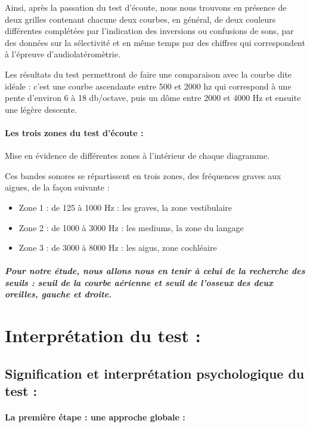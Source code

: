 \documentclass[12pt,french]{report}
\begin{document}
Ainsi, après la passation du test d\textquoteright écoute, nous nous
trouvons en présence de deux grilles contenant chacune deux courbes,
en général, de deux couleurs différentes complétées par l'indication
des inversions ou confusions de sons, par des données sur la sélectivité
et en même temps par des chiffres qui correspondent à l'épreuve d'audiolatéromètrie.

Les résultats du test permettront de faire une comparaison avec la
courbe dite idéale : c'est une courbe ascendante entre 500 et 2000
hz qui correspond à une pente d\textquoteright environ 6 à 18 db/octave,
puis un dôme entre 2000 et 4000 Hz et ensuite une légère descente. 

\paragraph{Les trois zones du test d'écoute : }

Mise en évidence de différentes zones à l\textquoteright intérieur
de chaque diagramme. 

Ces bandes sonores se répartissent en trois zones, des fréquences
graves aux aigues, de la façon suivante :
\begin{itemize}
\item Zone 1 : de 125 à 1000 Hz : les graves, la zone vestibulaire
\item Zone 2 : de 1000 à 3000 Hz : les mediums, la zone du langage
\item Zone 3 : de 3000 à 8000 Hz : les aigus, zone cochléaire
\end{itemize}

\subparagraph*{Pour notre étude, nous allons nous en tenir à celui de la recherche
des seuils : seuil de la courbe aérienne et seuil de l'osseux des
deux oreilles, gauche et droite.}

\section{Interprétation du test : }

\subsection{Signification et interprétation psychologique du test : }

\paragraph{La première étape : une approche globale : }
\end{document}
